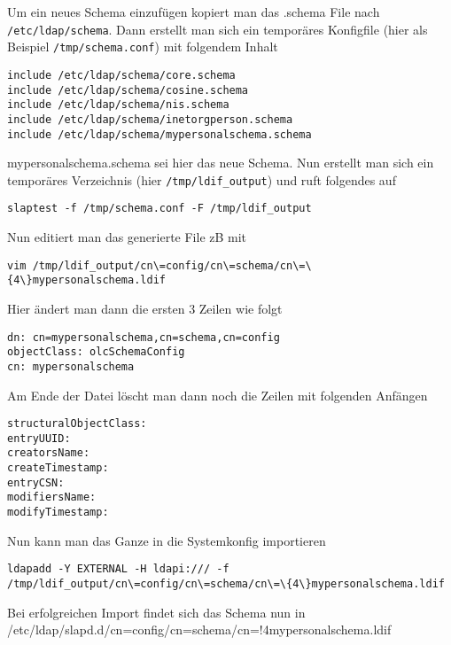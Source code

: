 \documentclass[11pt,a4paper,titlepage=firstiscover]{scrartcl} %
\begin{document}
Um ein neues Schema einzufügen kopiert man das .schema File nach \texttt{/etc/ldap/schema}.
Dann erstellt man sich ein temporäres Konfigfile (hier als Beispiel \texttt{/tmp/schema.conf}) mit folgendem Inhalt
\begin{lstlisting}
include /etc/ldap/schema/core.schema
include /etc/ldap/schema/cosine.schema
include /etc/ldap/schema/nis.schema
include /etc/ldap/schema/inetorgperson.schema
include /etc/ldap/schema/mypersonalschema.schema
\end{lstlisting}
mypersonalschema.schema sei hier das neue Schema. Nun erstellt man sich ein temporäres Verzeichnis (hier \texttt{/tmp/ldif_output}) und ruft folgendes auf
\begin{lstlisting}
slaptest -f /tmp/schema.conf -F /tmp/ldif_output
\end{lstlisting}
Nun editiert man das generierte File zB mit
\begin{lstlisting}
vim /tmp/ldif_output/cn\=config/cn\=schema/cn\=\{4\}mypersonalschema.ldif
\end{lstlisting}
Hier ändert man dann die ersten 3 Zeilen wie folgt
\begin{lstlisting}
dn: cn=mypersonalschema,cn=schema,cn=config
objectClass: olcSchemaConfig
cn: mypersonalschema
\end{lstlisting}
Am Ende der Datei löscht man dann noch die Zeilen mit folgenden Anfängen
\begin{lstlisting}
structuralObjectClass:
entryUUID:
creatorsName:
createTimestamp:
entryCSN:
modifiersName:
modifyTimestamp:
\end{lstlisting}
Nun kann man das Ganze in die Systemkonfig importieren
\begin{lstlisting}
ldapadd -Y EXTERNAL -H ldapi:/// -f /tmp/ldif_output/cn\=config/cn\=schema/cn\=\{4\}mypersonalschema.ldif
\end{lstlisting}
Bei erfolgreichen Import findet sich das Schema nun in /etc/ldap/slapd.d/cn=config/cn=schema/cn=!{4}mypersonalschema.ldif
\end{document}
